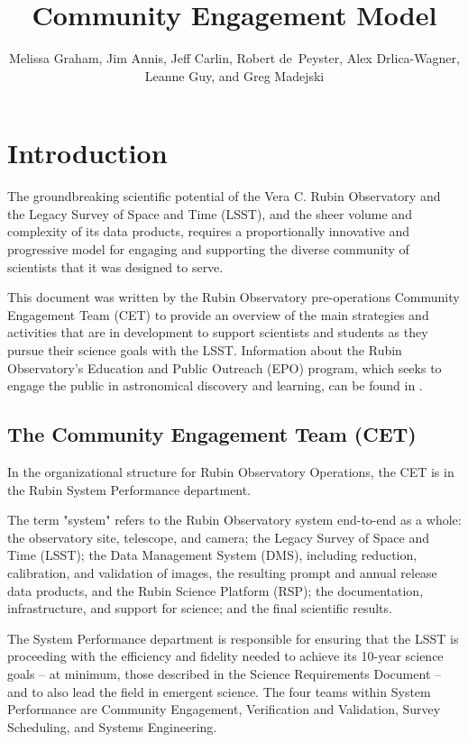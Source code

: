 \documentclass[DM,lsstdraft,toc]{lsstdoc}
\title{Community Engagement Model}
\author{%
Melissa Graham, Jim Annis, Jeff Carlin, Robert de~Peyster, Alex Drlica-Wagner, Leanne Guy, and Greg Madejski
}
\date{\vcsDate}
\begin{document}
\maketitle



\section{Introduction}\label{sec:intro}

The groundbreaking scientific potential of the Vera C. Rubin Observatory and the Legacy Survey of Space and Time (LSST), and the sheer volume and complexity of its data products, requires a proportionally innovative and progressive model for engaging and supporting the diverse community of scientists that it was designed to serve. 

This document was written by the Rubin Observatory pre-operations Community Engagement Team (CET) to provide an overview of the main strategies and activities that are in development to support scientists and students as they pursue their science goals with the LSST. 
Information about the Rubin Observatory's Education and Public Outreach (EPO) program, which seeks to engage the public in astronomical discovery and learning, can be found in .


\subsection{The Community Engagement Team (CET)}\label{sec:intro_org}

In the organizational structure for Rubin Observatory Operations, the CET is in the Rubin System Performance department.

The term "system" refers to the Rubin Observatory system end-to-end as a whole: the observatory site, telescope, and camera; the Legacy Survey of Space and Time (LSST); the Data Management System (DMS), including reduction, calibration, and validation of images, the resulting prompt and annual release data products, and the Rubin Science Platform (RSP); the documentation, infrastructure, and support for science; and the final scientific results. 

The System Performance department is responsible for ensuring that the LSST is proceeding with the efficiency and fidelity needed to achieve its 10-year science goals -- at minimum, those described in the Science Requirements Document  -- and to also lead the field in emergent science.
The four teams within System Performance are Community Engagement, Verification and Validation, Survey Scheduling, and Systems Engineering.
\end{document}
